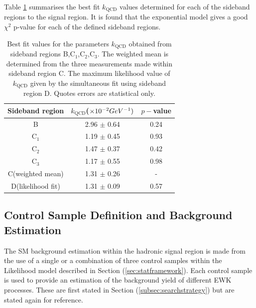 Table \ref{tab:kqcdresults} summarises the best fit $k_{\text{QCD}}$ values determined for each of the sideband regions to the signal region. It is found that the exponential model gives a good $\chi^{2}$ p-value for each of the defined sideband regions.

\begin{table}[h!]
\footnotesize
\begin{center}
\begin{tabular*}{0.6\textwidth}{@{\extracolsep{\fill}}ccc}
\hline
Sideband region & $k_{\text{QCD}}$($\times 10^{-2} GeV^{-1})$ & $p-$value\\ 
\hline\hline
B & 2.96 $\pm$ 0.64 & 0.24 \\
C$_{1}$ & 1.19 $\pm$ 0.45 & 0.93 \\
C$_{2}$ & 1.47 $\pm$ 0.37 & 0.42 \\
C$_{3}$ & 1.17 $\pm$ 0.55 & 0.98 \\
\cline{1-3}
C(weighted mean) & 1.31 $\pm$ 0.26 & - \\
D(likelihood fit) & 1.31 $\pm$ 0.09 & 0.57 \\
\end{tabular*}
\end{center}
\caption[Best fit values for the parameters $k_{\text{QCD}}$ obtained from sideband regions B,C$_{1}$,C$_{2}$,C$_{3}$. ]{Best fit values for the parameters $k_{\text{QCD}}$ obtained from sideband regions B,C$_{1}$,C$_{2}$,C$_{3}$. The weighted mean is determined from the three measurements made within sideband region C. The maximum likelihood value of $k_{\text{QCD}}$ given by the simultaneous fit using sideband region D. Quotes errors are statistical only. }
\label{tab:kqcdresults}
\end{table}


\subsection{Control Sample Definition and Background Estimation}
\label{subsec:controlsampledefinition}

The \ac{SM} background estimation within the hadronic signal region is made from the use of a single or a combination of three control samples within the Likelihood model described in Section (\ref{sec:statframework}). Each control sample is used to provide an estimation of the background yield of different \ac{EWK} processes. These are first stated in Section (\ref{subsec:searchstrategy}) but are stated again for reference.

